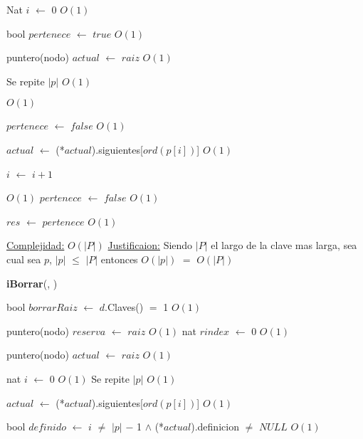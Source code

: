 \begin{Algoritmos}
\begin{algorithm}[H]
\begin{algorithmic}[1]
\State Nat $i$ $\gets$ $0$ \Comment $O(1)$

\State bool $pertenece$ $\gets$ $true$ \Comment $O(1)$

\State puntero(nodo) $actual$ $\gets$ $raiz$ \Comment $O(1)$ 

   \Comment Se repite $|p|$ $O(1)$
		
	
	 \Comment $O(1)$

		\State $pertenece$ $\gets$ $false$ \Comment $O(1)$	 
	
	\EndIf
	
	\State $actual$ $\gets$ (*$actual$).siguientes[$ord(p[i])$] \Comment $O(1)$

	\State $i$ $\gets$ $i + 1$
\EndWhile 

 \Comment $O(1)$ 
	\State $pertenece$ $\gets$ $false$ \Comment $O(1)$
\EndIf

\State $res$ $\gets$ $pertenece$ \Comment $O(1)$ 

\medskip
\State \underline{Complejidad:} $O(|P|)$
\State \underline{Justificaion:} Siendo $|P|$ el largo de la clave mas larga, sea cual sea $p$, $|p|$ $\leq$ $|P|$ entonces 	$O(|p|)$ $=$ $O(|P|)$

\end{algorithmic}
\end{algorithm}



\begin{algorithm}[H]
{\textbf{iBorrar}(, })
\begin{algorithmic}[1]

\State bool $borrarRaiz$ $\gets$ $d$.Claves() $=$ 1 \Comment $O(1)$

\State puntero(nodo) $reserva$ $\gets$ $raiz$ \Comment $O(1)$ 
\State nat $rindex$ $\gets$ 0 \Comment $O(1)$

\State puntero(nodo) $actual$ $\gets$ $raiz$ \Comment $O(1)$ 

\State nat $i$ $\gets$ 0 \Comment $O(1)$
   \Comment Se repite $|p|$ $O(1)$
		
	
	
	\State $actual$ $\gets$ (*$actual$).siguientes[$ord(p[i])$] \Comment $O(1)$

	\State bool $definido$ $\gets$ $i$ $\neq$ $|p|$ $-$ 1 $\land$ (*$actual$).definicion $\neq$ $NULL$ \Comment $O(1)$


\end{algorithmic}
\end{algorithm}
\end{Algoritmos}
